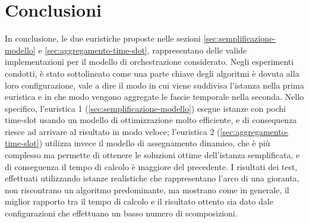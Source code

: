 \chapter{Conclusioni}
\label{cap:conclusioni}

In conclusione, le due euristiche proposte nelle sezioni \ref{sec:semplificazione-modello} e \ref{sec:aggregamento-time-slot}, rappresentano delle valide implementazioni per il modello di orchestrazione considerato. Negli esperimenti condotti, è stato sottolineato come una parte chiave degli algoritmi è dovuta alla loro configurazione, vale a dire il modo in cui viene suddivisa l'istanza nella prima euristica e in che modo vengono aggregate le fascie temporale nella seconda. Nello specifico, l'euristica 1 (\autoref{sec:semplificazione-modello}) esegue istanze con pochi time-slot usando un modello di ottimizzazione molto efficiente, e di consequenza riesce ad arrivare al risultato in modo veloce; l'euristica 2 (\autoref{sec:aggregamento-time-slot}) utilizza invece il modello di assegnamento dinamico, che è più complesso ma permette di ottenere le soluzioni ottime dell'istanza semplificata, e di conseguenza il tempo di calcolo è maggiore del precedente. I risultati dei test, effettuati utilizzando istanze realistiche che rappresentano l'arco di una gioranta, non riscontrano un algoritmo predominante, ma mostrano come in generale, il miglior rapporto tra il tempo di calcolo e il risultato ottento sia dato dale configurazioni che effettuano un basso numero di scomposizioni.
